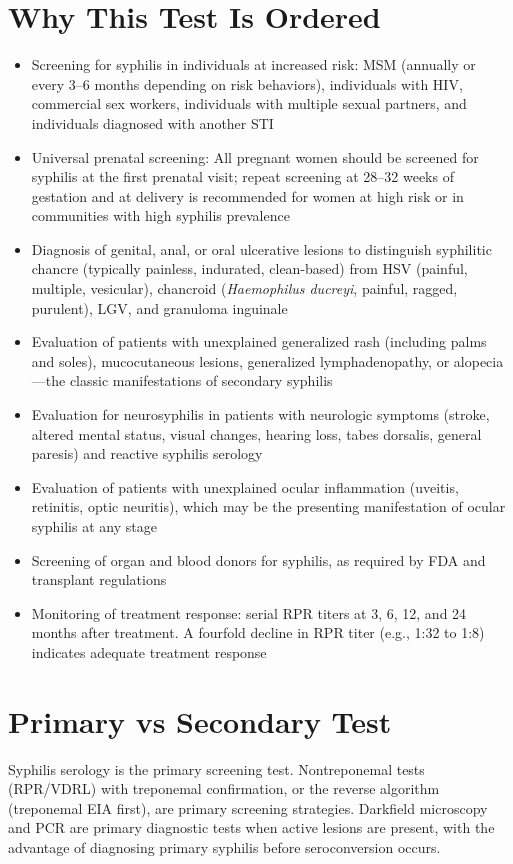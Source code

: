 \section*{Why This Test Is Ordered}
\begin{itemize}
  \item Screening for syphilis in individuals at increased risk: MSM (annually or every 3--6 months depending on risk behaviors), individuals with HIV, commercial sex workers, individuals with multiple sexual partners, and individuals diagnosed with another STI
  \item Universal prenatal screening: All pregnant women should be screened for syphilis at the first prenatal visit; repeat screening at 28--32 weeks of gestation and at delivery is recommended for women at high risk or in communities with high syphilis prevalence
  \item Diagnosis of genital, anal, or oral ulcerative lesions to distinguish syphilitic chancre (typically painless, indurated, clean-based) from HSV (painful, multiple, vesicular), chancroid (\textit{Haemophilus ducreyi}, painful, ragged, purulent), LGV, and granuloma inguinale
  \item Evaluation of patients with unexplained generalized rash (including palms and soles), mucocutaneous lesions, generalized lymphadenopathy, or alopecia---the classic manifestations of secondary syphilis
  \item Evaluation for neurosyphilis in patients with neurologic symptoms (stroke, altered mental status, visual changes, hearing loss, tabes dorsalis, general paresis) and reactive syphilis serology
  \item Evaluation of patients with unexplained ocular inflammation (uveitis, retinitis, optic neuritis), which may be the presenting manifestation of ocular syphilis at any stage
  \item Screening of organ and blood donors for syphilis, as required by FDA and transplant regulations
  \item Monitoring of treatment response: serial RPR titers at 3, 6, 12, and 24 months after treatment. A fourfold decline in RPR titer (e.g., 1:32 to 1:8) indicates adequate treatment response
\end{itemize}

\section*{Primary vs Secondary Test}
Syphilis serology is the primary screening test. Nontreponemal tests (RPR/VDRL) with treponemal confirmation, or the reverse algorithm (treponemal EIA first), are primary screening strategies. Darkfield microscopy and PCR are primary diagnostic tests when active lesions are present, with the advantage of diagnosing primary syphilis before seroconversion occurs.

